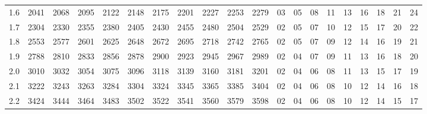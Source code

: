 \documentclass[12pt,UTF8,fontset=none]{ctexbook}
\begin{document}
\begin{appendix}
\begin{longtable}{|c| c c c c c | c c c c c| c c c c c c c c c|}
\scriptsize 1.6 & \scriptsize 2041 & \scriptsize 2068 & \scriptsize 2095 & \scriptsize 2122 & \scriptsize 2148 & \scriptsize 2175 & \scriptsize 2201 & \scriptsize 2227 & \scriptsize 2253 & \scriptsize 2279 & \scriptsize 03 & \scriptsize 05 & \scriptsize 08 & \scriptsize 11 & \scriptsize 13 & \scriptsize 16 & \scriptsize 18 & \scriptsize 21 & \scriptsize 24 \\
\scriptsize 1.7 & \scriptsize 2304 & \scriptsize 2330 & \scriptsize 2355 & \scriptsize 2380 & \scriptsize 2405 & \scriptsize 2430 & \scriptsize 2455 & \scriptsize 2480 & \scriptsize 2504 & \scriptsize 2529 & \scriptsize 02 & \scriptsize 05 & \scriptsize 07 & \scriptsize 10 & \scriptsize 12 & \scriptsize 15 & \scriptsize 17 & \scriptsize 20 & \scriptsize 22 \\
\scriptsize 1.8 & \scriptsize 2553 & \scriptsize 2577 & \scriptsize 2601 & \scriptsize 2625 & \scriptsize 2648 & \scriptsize 2672 & \scriptsize 2695 & \scriptsize 2718 & \scriptsize 2742 & \scriptsize 2765 & \scriptsize 02 & \scriptsize 05 & \scriptsize 07 & \scriptsize 09 & \scriptsize 12 & \scriptsize 14 & \scriptsize 16 & \scriptsize 19 & \scriptsize 21 \\
\scriptsize 1.9 & \scriptsize 2788 & \scriptsize 2810 & \scriptsize 2833 & \scriptsize 2856 & \scriptsize 2878 & \scriptsize 2900 & \scriptsize 2923 & \scriptsize 2945 & \scriptsize 2967 & \scriptsize 2989 & \scriptsize 02 & \scriptsize 04 & \scriptsize 07 & \scriptsize 09 & \scriptsize 11 & \scriptsize 13 & \scriptsize 16 & \scriptsize 18 & \scriptsize 20 \\
\scriptsize 2.0 & \scriptsize 3010 & \scriptsize 3032 & \scriptsize 3054 & \scriptsize 3075 & \scriptsize 3096 & \scriptsize 3118 & \scriptsize 3139 & \scriptsize 3160 & \scriptsize 3181 & \scriptsize 3201 & \scriptsize 02 & \scriptsize 04 & \scriptsize 06 & \scriptsize 08 & \scriptsize 11 & \scriptsize 13 & \scriptsize 15 & \scriptsize 17 & \scriptsize 19 \\
\scriptsize 2.1 & \scriptsize 3222 & \scriptsize 3243 & \scriptsize 3263 & \scriptsize 3284 & \scriptsize 3304 & \scriptsize 3324 & \scriptsize 3345 & \scriptsize 3365 & \scriptsize 3385 & \scriptsize 3404 & \scriptsize 02 & \scriptsize 04 & \scriptsize 06 & \scriptsize 08 & \scriptsize 10 & \scriptsize 12 & \scriptsize 14 & \scriptsize 16 & \scriptsize 18 \\
\scriptsize 2.2 & \scriptsize 3424 & \scriptsize 3444 & \scriptsize 3464 & \scriptsize 3483 & \scriptsize 3502 & \scriptsize 3522 & \scriptsize 3541 & \scriptsize 3560 & \scriptsize 3579 & \scriptsize 3598 & \scriptsize 02 & \scriptsize 04 & \scriptsize 06 & \scriptsize 08 & \scriptsize 10 & \scriptsize 12 & \scriptsize 14 & \scriptsize 15 & \scriptsize 17 \\

\end{longtable}
\end{appendix}
\end{document}
